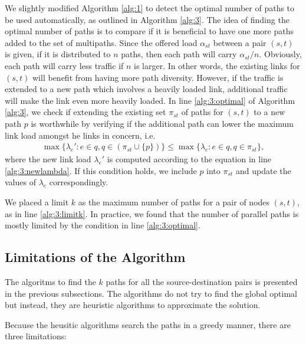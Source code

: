 \documentclass[conference]{IEEEtran}
\begin{document}
We slightly modified Algorithm \ref{alg:1} to detect the optimal number of
paths to be used automatically, as outlined in Algorithm \ref{alg:3}. The idea
of finding the optimal number of paths is to compare if it is beneficial to
have one more paths added to the set of multipaths. Since the offered load
$\alpha_{st}$ between a pair $(s,t)$ is given, if it is distributed to $n$
paths, then each path will carry $\alpha_{st}/n$. Obviously, each path will
carry less traffic if $n$ is larger. In other words, the existing links for
$(s,t)$ will benefit from having more path diversity. However, if the traffic
is extended to a new path which involves a heavily loaded link, additional
traffic will make the link even more heavily loaded. In line
\ref{alg:3:optimal} of Algorithm \ref{alg:3}, we check if extending the
existing set $\pi_{st}$ of paths for $(s,t)$ to a new path $p$ is worthwhile by
verifying if the additional path can lower the maximum link load amongst he
links in concern, i.e.
\begin{align*}
\max \{\lambda_e': e\in q, q\in(\pi_{st}\cup\{p\})\} \le \max \{\lambda_e:e\in q, q\in\pi_{st}\},
\end{align*}
where the new link load $\lambda_e'$ is computed according to the equation in
line \ref{alg:3:newlambda}. If this condition holds, we include $p$ into
$\pi_{st}$ and update the values of $\lambda_e$ correspondingly.

We placed a limit $k$ as the maximum number of paths for a pair of nodes
$(s,t)$, as in line \ref{alg:3:limitk}. In practice, we found that the number
of parallel paths is mostly limited by the condition in line
\ref{alg:3:optimal}.

\subsection{Limitations of the Algorithm}

The algoritms to find the $k$ paths for all the source-destination pairs is
presented in the previous subsections. The algorithms do not try to find the global
optimal but instead, they are heuristic algorithms to approximate the solution.

Because the heusitic algorithms search the paths in a greedy manner, there are
three limitations:
\end{document}
